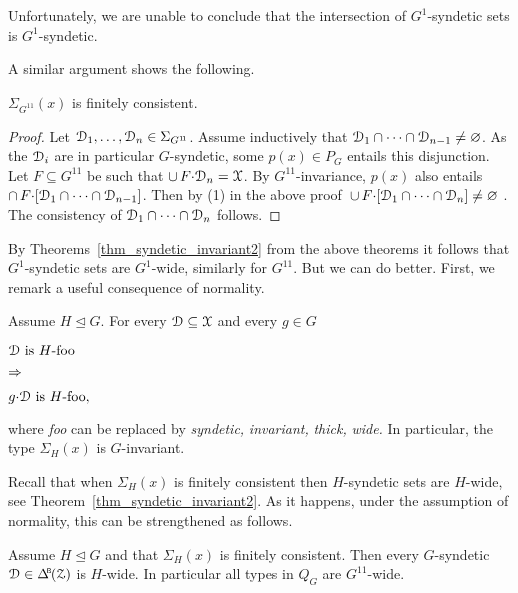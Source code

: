 Unfortunately, we are unable to conclude that the intersection of $G^1$-syndetic sets is $G^1$-syndetic.

A similar argument shows the following.

\begin{theorem}\label{thm_gammaP}
   $\Sigma_{G^{1\!1}}(x)$ is finitely consistent.
\end{theorem}

\begin{proof}
  \def\medrel#1{\parbox[t]{5ex}{$\displaystyle\hfil #1$}}
  \def\ceq#1#2#3{\parbox[t]{23ex}{$\displaystyle #1$}\medrel{#2}{$\displaystyle #3$}}   
  Let $\EuScript D_1,\dots,\EuScript D_n\in\Sigma_{G^{1\!1}}$.
  Assume inductively that $\EuScript D_1\cap\dots\cap\EuScript D_{n-1}\neq\varnothing$.
  As the $\EuScript D_i$ are in particular $G$-syndetic, some $p(x)\in P_G$ entails this disjunction.
  Let $F\subseteq G^{1\!1}$ be such that $\cup\,F{\cdot}\EuScript D_n=\EuScript X$.
  By $G^{1\!1}$-invariance, $p(x)$ also entails $\cap\, F{\cdot}[\EuScript D_1\cap\dots\cap\EuScript D_{n-1}]$.
  Then by (1) in the above proof $\,\cup\,F{\cdot}[\EuScript D_1\cap\dots\cap\EuScript D_n]\neq\varnothing$ .
  The consistency of $\EuScript D_1\cap\dots\cap\EuScript D_n$ follows.
\end{proof}


By Theorems~\ref{thm_syndetic_invariant2} from the above theorems it follows that $G^1$-syndetic sets are $G^1$-wide, similarly for $G^{1\!1}$.
But we can do better.
First, we remark a useful consequence of normality.

\begin{remark}\label{rem_invariance_normalsubg}
\def\medrel#1{\parbox[t]{5ex}{$\displaystyle\hfil #1$}}
\def\ceq#1#2#3{\parbox[t]{20ex}{$\displaystyle #1$}\medrel{#2}{$\displaystyle #3$}}
  Assume $H\trianglelefteq G$.
  For every $\EuScript D\subseteq\EuScript X$ and every $g\in G$ \smallskip
  
  \ceq{\hfill\D\textrm{ is }H\textrm{-foo}}{\Rightarrow}{g{\cdot}\D\textrm{ is }H\textrm{-foo},} \smallskip
  
  where \textit{foo\/} can be replaced by \textit{syndetic,} \textit{invariant,} \textit{thick,} \textit{wide.}
  In particular, the type $\Sigma_H(x)$ is $G$-invariant.
\end{remark}

Recall that when $\Sigma_H(x)$ is finitely consistent then $H$-syndetic sets are $H$-wide, see Theorem~\ref{thm_syndetic_invariant2}.
As it happens, under the assumption of normality, this can be strengthened as follows.

\begin{proposition}\label{prop_Gsyndetic_Hthick1}
  Assume $H\trianglelefteq G$ and that $\Sigma_H(x)$ is finitely consistent.
  Then every $G$-syn\-detic $\D\in\BDelta(\Z)$ is $H$-wide.
  In particular all types in $Q_G$ are $G^{1\!1}$-wide.
\end{proposition}

